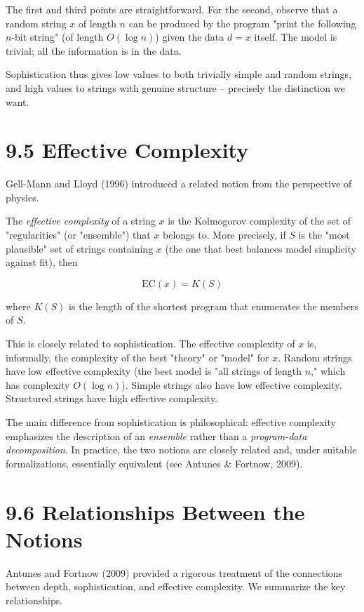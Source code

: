 The first and third points are straightforward. For the second, observe that a random string $x$ of length $n$ can be produced by the program "print the following $n$-bit string" (of length $O(\log n)$) given the data $d = x$ itself. The model is trivial; all the information is in the data.

Sophistication thus gives low values to both trivially simple and random strings, and high values to strings with genuine structure -- precisely the distinction we want.

\section{9.5 Effective Complexity}

Gell-Mann and Lloyd (1996) introduced a related notion from the perspective of physics.

\begin{definition}
The \textit{effective complexity} of a string $x$ is the Kolmogorov complexity of the set of "regularities" (or "ensemble") that $x$ belongs to. More precisely, if $S$ is the "most plausible" set of strings containing $x$ (the one that best balances model simplicity against fit), then

\[
\text{EC}(x) = K(S)
\]

where $K(S)$ is the length of the shortest program that enumerates the members of $S$.

This is closely related to sophistication. The effective complexity of $x$ is, informally, the complexity of the best "theory" or "model" for $x$. Random strings have low effective complexity (the best model is "all strings of length $n$," which has complexity $O(\log n)$). Simple strings also have low effective complexity. Structured strings have high effective complexity.

The main difference from sophistication is philosophical: effective complexity emphasizes the description of an \textit{ensemble} rather than a \textit{program-data decomposition}. In practice, the two notions are closely related and, under suitable formalizations, essentially equivalent (see Antunes & Fortnow, 2009).
\end{definition}

\section{9.6 Relationships Between the Notions}

Antunes and Fortnow (2009) provided a rigorous treatment of the connections between depth, sophistication, and effective complexity. We summarize the key relationships.

